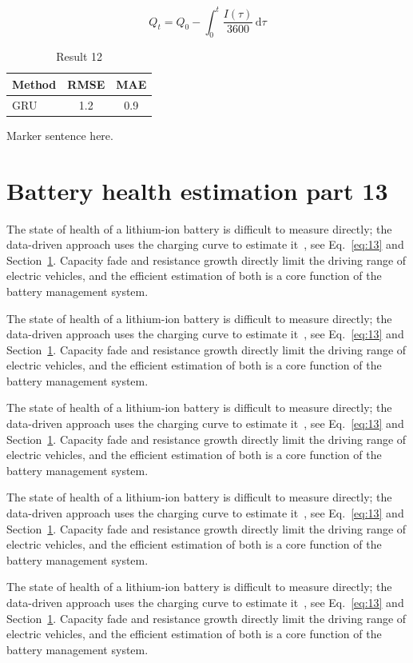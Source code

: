\documentclass[11pt]{article}
\begin{document}
\begin{equation}\label{eq:12}
  Q_t = Q_0 - \int_0^t \frac{I(\tau)}{3600}\,\mathrm{d}\tau
\end{equation}
\begin{table}[h]\centering\begin{tabular}{lcc}\toprule Method & RMSE & MAE\\\midrule GRU & 1.2 & 0.9\\\bottomrule\end{tabular}\caption{Result 12}\end{table}


Marker sentence here.
\section{Battery health estimation part 13}\label{sec:13}
The state of health of a lithium-ion battery is difficult to measure directly; the data-driven approach uses the charging curve to estimate it~\cite{a2020}, see Eq.~\eqref{eq:13} and Section~\ref{sec:13}. Capacity fade and resistance growth directly limit the driving range of electric vehicles, and the efficient estimation of both is a core function of the battery management system.

The state of health of a lithium-ion battery is difficult to measure directly; the data-driven approach uses the charging curve to estimate it~\cite{a2020}, see Eq.~\eqref{eq:13} and Section~\ref{sec:13}. Capacity fade and resistance growth directly limit the driving range of electric vehicles, and the efficient estimation of both is a core function of the battery management system.

The state of health of a lithium-ion battery is difficult to measure directly; the data-driven approach uses the charging curve to estimate it~\cite{a2020}, see Eq.~\eqref{eq:13} and Section~\ref{sec:13}. Capacity fade and resistance growth directly limit the driving range of electric vehicles, and the efficient estimation of both is a core function of the battery management system.

The state of health of a lithium-ion battery is difficult to measure directly; the data-driven approach uses the charging curve to estimate it~\cite{a2020}, see Eq.~\eqref{eq:13} and Section~\ref{sec:13}. Capacity fade and resistance growth directly limit the driving range of electric vehicles, and the efficient estimation of both is a core function of the battery management system.

The state of health of a lithium-ion battery is difficult to measure directly; the data-driven approach uses the charging curve to estimate it~\cite{a2020}, see Eq.~\eqref{eq:13} and Section~\ref{sec:13}. Capacity fade and resistance growth directly limit the driving range of electric vehicles, and the efficient estimation of both is a core function of the battery management system.
\end{document}

